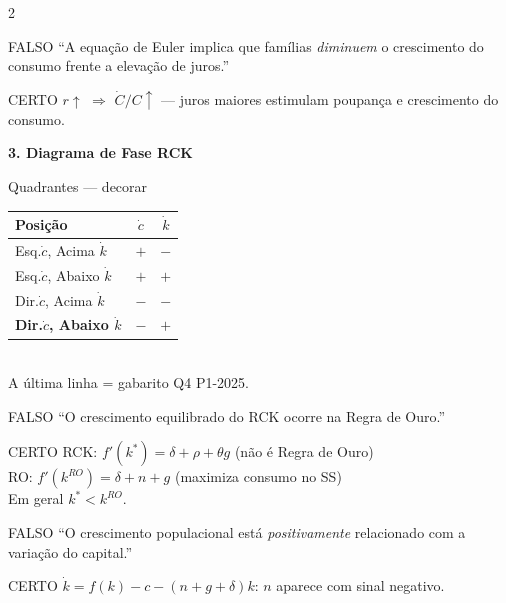 \documentclass[10pt, a4paper]{article}
\begin{document}
\begin{multicols}{2}
\begin{errobox}{FALSO}
``A equação de Euler implica que famílias \emph{diminuem} o crescimento do consumo frente a elevação de juros.''
\end{errobox}
\vspace{0.3em}
\begin{certobox}{CERTO}
$r\uparrow$ $\Rightarrow$ $\dot C/C\uparrow$ — juros maiores estimulam poupança e crescimento do consumo.
\end{certobox}

\vspace{0.5em}
\textbf{\color{azul}\large 3. Diagrama de Fase RCK}

\begin{certobox}{Quadrantes — decorar}
\begin{tabular}{lcc}
\toprule
Posição & $\dot c$ & $\dot k$ \\
\midrule
Esq.$\dot c$, Acima $\dot k$ & $+$ & $-$ \\
Esq.$\dot c$, Abaixo $\dot k$ & $+$ & $+$ \\
Dir.$\dot c$, Acima $\dot k$ & $-$ & $-$ \\
\textbf{Dir.$\dot c$, Abaixo $\dot k$} & $-$ & $+$ \\
\bottomrule
\end{tabular}\\
\small A última linha = gabarito Q4 P1-2025.
\end{certobox}

\begin{errobox}{FALSO}
``O crescimento equilibrado do RCK ocorre na Regra de Ouro.''
\end{errobox}
\vspace{0.3em}
\begin{certobox}{CERTO}
RCK: $f'(k^*) = \delta+\rho+\theta g$ \quad(não é Regra de Ouro)\\
RO: $f'(k^{RO}) = \delta+n+g$ \quad(maximiza consumo no SS)\\
Em geral $k^* < k^{RO}$.
\end{certobox}

\begin{errobox}{FALSO}
``O crescimento populacional está \emph{positivamente} relacionado com a variação do capital.''
\end{errobox}
\vspace{0.3em}
\begin{certobox}{CERTO}
$\dot k = f(k)-c-(n+g+\delta)k$: $n$ aparece com sinal negativo.
\end{certobox}


\end{multicols}
\end{document}
